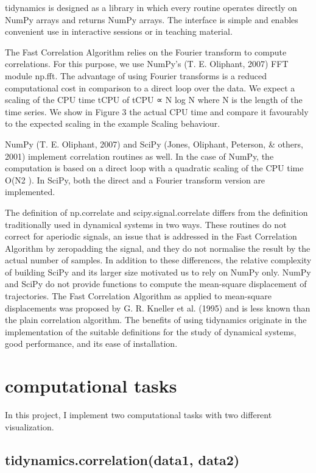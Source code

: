 \documentclass[12pt, a4paper, twoside]{report}
\begin{document}
tidynamics is designed as a library in which every routine operates directly on NumPy
arrays and returns NumPy arrays. The interface is simple and enables convenient use in
interactive sessions or in teaching material.

The Fast Correlation Algorithm relies on the Fourier transform to compute correlations.
For this purpose, we use NumPy’s (T. E. Oliphant, 2007) FFT module np.fft. The
advantage of using Fourier transforms is a reduced computational cost in comparison to a
direct loop over the data. We expect a scaling of the CPU time tCPU of tCPU ∝ N log N
where N is the length of the time series. We show in Figure 3 the actual CPU time and
compare it favourably to the expected scaling in the example Scaling behaviour.

NumPy (T. E. Oliphant, 2007) and SciPy (Jones, Oliphant, Peterson, & others, 2001)
implement correlation routines as well. In the case of NumPy, the computation is based
on a direct loop with a quadratic scaling of the CPU time O(N2
). In SciPy, both the
direct and a Fourier transform version are implemented.

The definition of np.correlate and scipy.signal.correlate differs from the definition
traditionally used in dynamical systems in two ways. These routines do not correct for
aperiodic signals, an issue that is addressed in the Fast Correlation Algorithm by zeropadding the signal, and they do not normalise the result by the actual number of samples.
In addition to these differences, the relative complexity of building SciPy and its larger
size motivated us to rely on NumPy only. NumPy and SciPy do not provide functions to
compute the mean-square displacement of trajectories. The Fast Correlation Algorithm
as applied to mean-square displacements was proposed by G. R. Kneller et al. (1995) and
is less known than the plain correlation algorithm.
The benefits of using tidynamics originate in the implementation of the suitable definitions
for the study of dynamical systems, good performance, and its ease of installation.


\newpage
\section{computational tasks}
In this project, I implement two computational tasks with two different visualization.


\subsection{tidynamics.correlation(data1, data2)}
\end{document}
